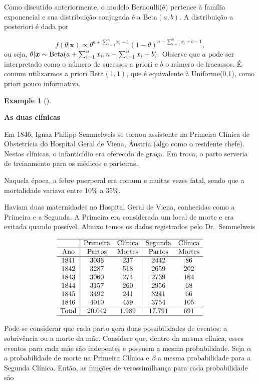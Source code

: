 \documentclass[
  letterpaper,
  DIV=11,
  numbers=noendperiod]{scrreprt}
\theoremstyle{plain}
\theoremstyle{definition}
\newtheorem{example}{Example}[chapter]
\theoremstyle{definition}
\theoremstyle{remark}
\begin{document}
Como discutido anteriormente, o modelo Bernoulli(\(\theta\)) pertence à
família exponencial e sua distribuição conjugada é a Beta\((a,b)\). A
distribuição a posteriori é dada por

\[f(\theta|\boldsymbol{x})\propto \theta^{a+\sum_{i=1}^n x_i-1}(1-\theta)^{n-\sum_{i=1}^n x_i+b-1},\]
ou seja,
\(\theta|\boldsymbol{x}\sim\hbox{Beta}(a+\sum_{i=1}^n x_i,n-\sum_{i=1}^n x_i + b).\)
Observe que \(a\) pode ser interpretado como o número de sucessos a
priori e \(b\) o número de fracassos. É comum utilizarmos a priori
Beta\((1,1)\), que é equivalente à Uniforme(0,1), como priori pouco
informativa.

\begin{example}[]\protect\hypertarget{exm-}{}\label{exm-}

\textbf{As duas clínicas}

Em 1846, Ignaz Philipp Semmelweis se tornou assistente na Primeira
Clínica de Obstetrícia do Hospital Geral de Viena, Áustria (algo como o
residente chefe). Nestas clínicas, o infanticídio era oferecido de
graça. Em troca, o parto serveria de treinamento para os médicos e
parteiras.

Naquela época, a febre puerperal era comum e muitas vezes fatal, sendo
que a mortalidade variava entre 10\% a 35\%.

Haviam duas maternidades no Hospital Geral de Viena, conhecidas como a
Primeira e a Segunda. A Primeira era considerada um local de morte e era
evitada quando possível. Abaixo temos os dados registrados pelo
Dr.~Semmelweis

\[\begin{array}{c|cc|cc}\hline \hbox{} & \hbox{Primeira} & \hbox{Clínica} & \hbox{Segunda} & \hbox{Clínica}\\ \hline
\hbox{Ano} & \hbox{Partos} & \hbox{Mortes} &\hbox{Partos} & \hbox{Mortes} \\ \hline 
1841 & 3036 & 237 & 2442 & 86 \\
1842 & 3287 & 518 & 2659 & 202 \\
1843 & 3060 & 274 & 2739 & 164 \\
1844 & 3157 & 260 & 2956 & 68 \\
1845 & 3492 & 241 & 3241 & 66 \\
1846 & 4010 & 459 & 3754 & 105 \\ \hline
\hbox{Total} & 20.042 & 1.989 & 17.791 & 691 \\ \hline
\end{array}\]

Pode-se considerar que cada parto gera duas possibilidades de eventos: a
sobrivência ou a morte da mãe. Considere que, dentro da mesma clínica,
esses eventos para cada mãe são indepentes e possuem a mesma
probabilidade. Seja \(\alpha\) a probabilidade de morte na Primeira
Clínica e \(\beta\) a mesma probabilidade para a Segunda Clínica. Então,
as funções de verossimilhança para cada probabilidade são


\end{example}
\end{document}
